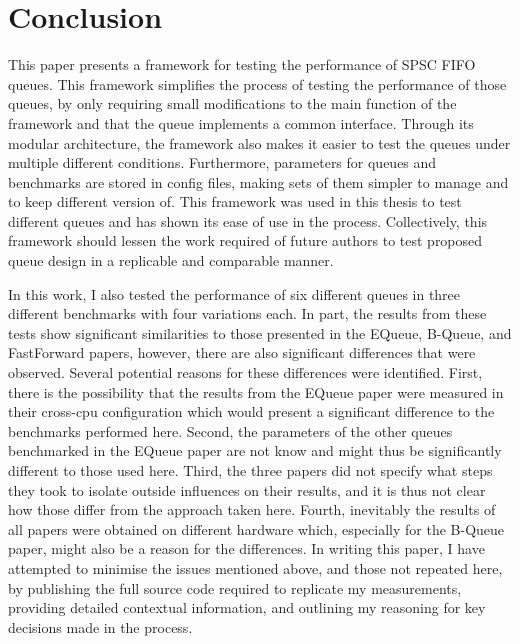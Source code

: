 \section{Conclusion}
This paper presents a framework for testing the performance of SPSC FIFO queues.
This framework simplifies the process of testing the performance of those queues, by only requiring small
modifications to the main function of the framework and that the queue implements a common interface.
Through its modular architecture, the framework also makes it easier to test the queues under multiple
different conditions.
Furthermore, parameters for queues and benchmarks are stored in config files, making sets of them simpler to
manage and to keep different version of.
This framework was used in this thesis to test different queues and has shown its ease of use in the process.
Collectively, this framework should lessen the work required of future authors to test proposed queue design
in a replicable and comparable manner.

In this work, I also tested the performance of six different queues in three different benchmarks with four
variations each.
In part, the results from these tests show significant similarities to those presented in the EQueue,
B-Queue, and FastForward papers, however, there are also significant differences that were
observed\cite{EQueue,B-Queue,FastForward}.
Several potential reasons for these differences were identified.
First, there is the possibility that the results from the EQueue paper were measured in their cross-cpu
configuration which would present a significant difference to the benchmarks performed here.
Second, the parameters of the other queues benchmarked in the EQueue paper are not know and might thus be
significantly different to those used here.
Third, the three papers did not specify what steps they took to isolate outside influences on their results,
and it is thus not clear how those differ from the approach taken here.
Fourth, inevitably the results of all papers were obtained on different hardware which, especially for the
B-Queue paper, might also be a reason for the differences.
In writing this paper, I have attempted to minimise the issues mentioned above, and those not repeated here,
by publishing the full source code required to replicate my measurements, providing detailed contextual
information, and outlining my reasoning for key decisions made in the process.

